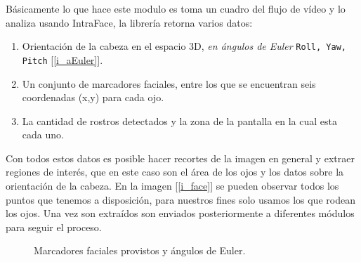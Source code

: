 \documentclass[12pt]{book} %
\begin{document}
		Básicamente lo que hace este modulo es toma un cuadro del flujo de vídeo y lo analiza usando IntraFace, la librería retorna varios
		datos:
		\begin{multicols}{2}
			\begin{enumerate}
				\item Orientación de la cabeza en el espacio 3D, \textit{en ángulos de Euler} \texttt{Roll, Yaw, Pitch} [\ref{i_aEuler}].
				\item Un conjunto de marcadores faciales, entre los que se encuentran seis coordenadas (x,y) para cada ojo.
				\item La cantidad de rostros detectados y la zona de la pantalla en la cual esta cada uno.
			\end{enumerate}
		\end{multicols}
		Con todos estos datos es posible hacer recortes de la imagen en general y extraer regiones de interés, que en este caso son el 
		área  de los ojos y los datos sobre la orientación de la cabeza.
		En la imagen [\ref{i_face}] se pueden observar todos los puntos que tenemos a disposición, para nuestros fines solo usamos 
		los que rodean los ojos. Una vez son extraídos son enviados posteriormente a diferentes módulos para seguir el proceso.
		\begin{figure}[hbt]
			\centering
				 \hspace{3cm}
			\caption{Marcadores faciales provistos y ángulos de Euler.}
		\end{figure}
	
\end{document}
